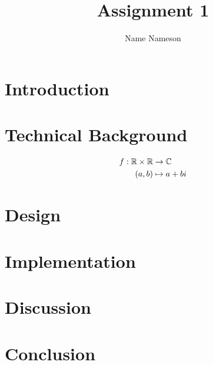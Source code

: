 \documentclass[bib,defpkg,inf2200,math]{simplereport}
\author{Name Nameson}
\title{Assignment 1}
\begin{document}
\maketitle

\section{Introduction}

\lipsum[1]\cite[p.~213]{pathen98}

\section{Technical Background}

\lipsum[2]

\begin{align*}
	f: \mathbb{R}\times\mathbb{R} &\to \mathbb{C} \\
	(a,b) &\mapsto a + bi
\end{align*}

\lipsum[3]

\section{Design}

\lipsum[4-5]

\section{Implementation}

\lipsum[6-7]

\section{Discussion}

\lipsum[8-11]

\section{Conclusion}

\lipsum[12-12]
\end{document}

